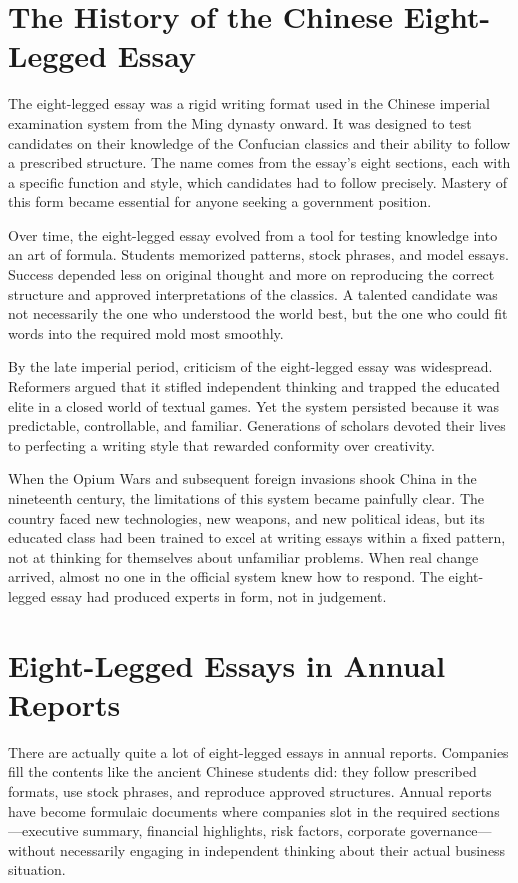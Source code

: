 \section{The History of the Chinese Eight-Legged Essay}

The eight-legged essay was a rigid writing format used in the Chinese imperial examination system from the Ming dynasty onward. It was designed to test candidates on their knowledge of the Confucian classics and their ability to follow a prescribed structure. The name comes from the essay's eight sections, each with a specific function and style, which candidates had to follow precisely. Mastery of this form became essential for anyone seeking a government position.

Over time, the eight-legged essay evolved from a tool for testing knowledge into an art of formula. Students memorized patterns, stock phrases, and model essays. Success depended less on original thought and more on reproducing the correct structure and approved interpretations of the classics. A talented candidate was not necessarily the one who understood the world best, but the one who could fit words into the required mold most smoothly.

By the late imperial period, criticism of the eight-legged essay was widespread. Reformers argued that it stifled independent thinking and trapped the educated elite in a closed world of textual games. Yet the system persisted because it was predictable, controllable, and familiar. Generations of scholars devoted their lives to perfecting a writing style that rewarded conformity over creativity.

When the Opium Wars and subsequent foreign invasions shook China in the nineteenth century, the limitations of this system became painfully clear. The country faced new technologies, new weapons, and new political ideas, but its educated class had been trained to excel at writing essays within a fixed pattern, not at thinking for themselves about unfamiliar problems. When real change arrived, almost no one in the official system knew how to respond. The eight-legged essay had produced experts in form, not in judgement.

\section{Eight-Legged Essays in Annual Reports}

There are actually quite a lot of eight-legged essays in annual reports. Companies fill the contents like the ancient Chinese students did: they follow prescribed formats, use stock phrases, and reproduce approved structures. Annual reports have become formulaic documents where companies slot in the required sections—executive summary, financial highlights, risk factors, corporate governance—without necessarily engaging in independent thinking about their actual business situation.

